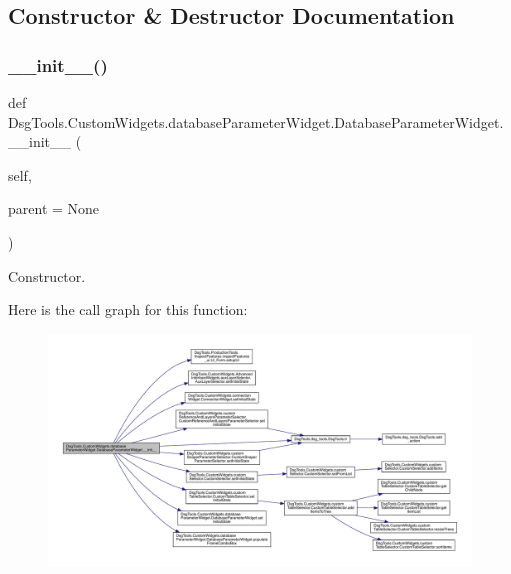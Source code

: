\subsection{Constructor \& Destructor Documentation}
\mbox{\label{class_dsg_tools_1_1_custom_widgets_1_1database_parameter_widget_1_1_database_parameter_widget_a8c1dccb54ae34de1ceee106c21c5ca3e}} 
\subsubsection{\texorpdfstring{\+\_\+\+\_\+init\+\_\+\+\_\+()}{\_\_init\_\_()}}
{\footnotesize\ttfamily def Dsg\+Tools.\+Custom\+Widgets.\+database\+Parameter\+Widget.\+Database\+Parameter\+Widget.\+\_\+\+\_\+init\+\_\+\+\_\+ (\begin{DoxyParamCaption}\item[{}]{self,  }\item[{}]{parent = {\ttfamily None} }\end{DoxyParamCaption})}

\begin{DoxyVerb}Constructor.\end{DoxyVerb}
 Here is the call graph for this function\+:
\nopagebreak
\begin{figure}[H]
\begin{center}
\leavevmode
\includegraphics[width=350pt]{class_dsg_tools_1_1_custom_widgets_1_1database_parameter_widget_1_1_database_parameter_widget_a8c1dccb54ae34de1ceee106c21c5ca3e_cgraph}
\end{center}
\end{figure}


